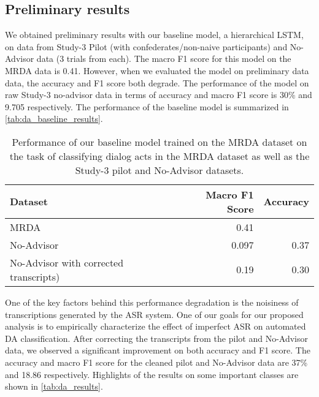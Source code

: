 \subsection{Preliminary results}

We obtained preliminary results with our baseline model, a hierarchical LSTM,
on data from Study-3 Pilot (with confederates/non-naive participants) and
No-Advisor data (3 trials from each).  The macro F1 score for this model on the
MRDA data is 0.41. However, when we evaluated the model on preliminary data
data, the accuracy and F1 score both degrade. The performance of the model on
raw Study-3 no-advisor data in terms of accuracy and macro F1 score is 30\% and
9.705 respectively. The performance of the baseline model is summarized in
\autoref{tab:da_baseline_results}.


\begin{table}
    \begin{tabular}{lrr}
        \toprule
        Dataset                                & Macro F1 Score & Accuracy \\\midrule
        MRDA                                   & 0.41           & \\
        No-Advisor                             & 0.097          & 0.37 \\
        No-Advisor with corrected transcripts) & 0.19           & 0.30 \\
        \bottomrule
    \end{tabular}
    \caption{%
        Performance of our baseline model trained on the MRDA dataset on the
        task of classifying dialog acts in the MRDA dataset as well as the
        Study-3 pilot and No-Advisor datasets.
    }
    \label{tab:da_baseline_results}
\end{table}

One of the key factors behind this performance degradation is the noisiness of
transcriptions generated by the ASR system. One of our goals for our proposed
analysis is to empirically characterize the effect of imperfect ASR on
automated DA classification.  After correcting the transcripts from the
pilot and No-Advisor data, we observed a significant improvement on both accuracy and F1
score. The accuracy and macro F1 score for the cleaned pilot and No-Advisor data are 37\%
and 18.86 respectively. Highlights of the results on some important classes are
shown in \autoref{tab:da_results}.

